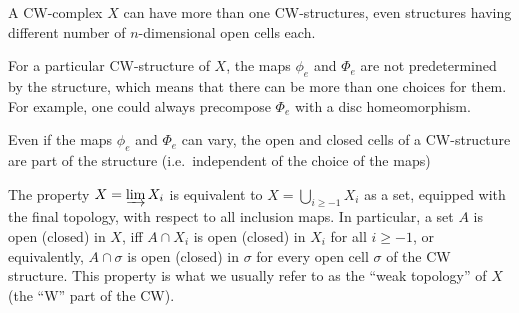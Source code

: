 \begin{notes}
\begin{i_enum}
\item A CW-complex $X$ can have more than one CW-structures, even structures having different number of $n$-dimensional open cells each.
\item For a particular CW-structure of $X$, the maps $\phi_e$ and $\Phi_e$ are not predetermined by the structure, which means that there can be more than one choices for them. For example, one could always precompose $\Phi_e$ with a disc homeomorphism.
\item Even if the maps $\phi_e$ and $\Phi_e$ can vary, the open and closed cells of a CW-structure are part of the structure (i.e.\ independent of the choice of the maps)
\end{i_enum} \end{notes}

\begin{remarks}
\begin{i_enum}
\item The property $X=\varinjlim X_i$ is equivalent to $X=\bigcup_{i\geq-1}X_i$ as a set, equipped with the final topology, with respect to all inclusion maps. In particular, a set $A$ is open (closed) in $X$, iff $A\cap X_i$ is open (closed) in $X_i$ for all $i\geq-1$, or equivalently, $A\cap\sigma$ is open (closed) in $\sigma$ for every open cell $\sigma$ of the CW structure. This property is what we usually refer to as the ``weak topology'' of $X$ (the ``W'' part of the CW).
\item 
\end{i_enum}
\end{remarks}
